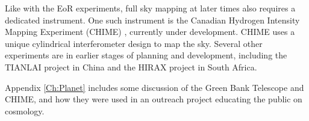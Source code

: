 Like with the EoR experiments, full sky mapping at later times also requires a dedicated instrument. One such instrument is the Canadian Hydrogen Intensity Mapping Experiment (CHIME) \cite{shaw_2014}\cite{chime}, currently under development. CHIME uses a unique cylindrical interferometer design to map the sky. Several other experiments are in earlier stages of planning and development, including the TIANLAI project in China and the HIRAX project in South Africa. 

Appendix \ref{Ch:Planet} includes some discussion of the Green Bank Telescope and CHIME, and how they were used in an outreach project educating the public on \cm cosmology. 

